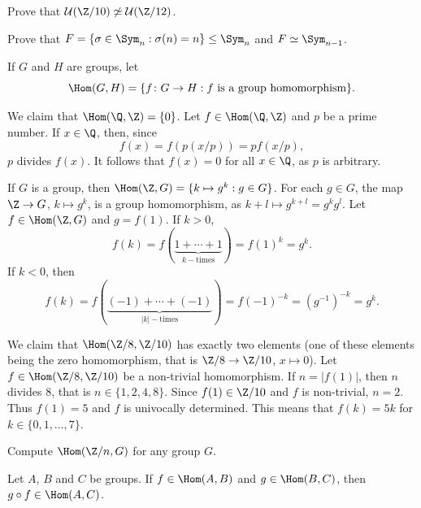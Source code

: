 \begin{exercise}
\label{xca:U(Z/10)}
   Prove that $\mathcal{U}(\Z/10)\not\simeq\mathcal{U}(\Z/12)$. 
\end{exercise}



\begin{exercise}
Prove that $F=\{\sigma\in\Sym_n:\sigma(n)=n\}\leq\Sym_n$ and $F\simeq\Sym_{n-1}$.
\end{exercise}

If $G$ and $H$ are groups, let 
\[
\Hom(G,H)=\{f\colon G\to H:f\text{ is a group homomorphism}\}.
\]

\begin{example}
We claim that 
$\Hom(\Q,\Z)=\{0\}$. Let $f\in\Hom(\Q,\Z)$ and $p$ be a prime number. 
If $x\in\Q$, then, since 
\[
f(x)=f\left(p(x/p)\right)=pf(x/p),
\]
$p$ divides $f(x)$. It follows that $f(x)=0$ for all
$x\in\Q$, as $p$ is arbitrary. 
\end{example}

\begin{example}
If $G$ is a group, then $\Hom(\Z,G)=\{k\mapsto g^k:g\in G\}$.
For each $g\in G$, the map $\Z\to G$, $k\mapsto g^k$, is a group
homomorphism, as 
$k+l\mapsto g^{k+l}=g^kg^l$. Let $f\in\Hom(\Z,G)$ and  $g=f(1)$. If $k>0$,
\[
f(k)=f(\underbrace{1+\cdots+1}_{k-\text{times}})=f(1)^k=g^k.
\]
If $k<0$, then
\[
f(k)=f(\underbrace{(-1)+\cdots+(-1)}_{|k|-\text{times}})=f(-1)^{-k}=(g^{-1})^{-k}=g^k.
\]
\end{example}

\begin{example}
We claim that $\Hom(\Z/8,\Z/10)$ has exactly two elements (one of these elements being 
the zero homomorphism, that is $\Z/8\to\Z/10$, $x\mapsto 0$).
Let $f\in\Hom(\Z/8,\Z/10)$ be a non-trivial homomorphism. 
If 
$n=|f(1)|$, then 
$n$ divides $8$, that is $n\in\{1,2,4,8\}$. Since $f(1)\in\Z/10$ and
$f$ is non-trivial,
$n=2$. Thus $f(1)=5$ and $f$ is univocally determined. 
This means that 
$f(k)=5k$ for $k\in\{0,1,\dots,7\}$.
\end{example}

\begin{exercise}
Compute $\Hom(\Z/n,G)$ for any group $G$.
\end{exercise}

\begin{exercise}
Let $A$, $B$ and $C$ be groups. If $f\in\Hom(A,B)$ and $g\in\Hom(B,C)$,
then $g\circ f\in\Hom(A,C)$.
\end{exercise}

